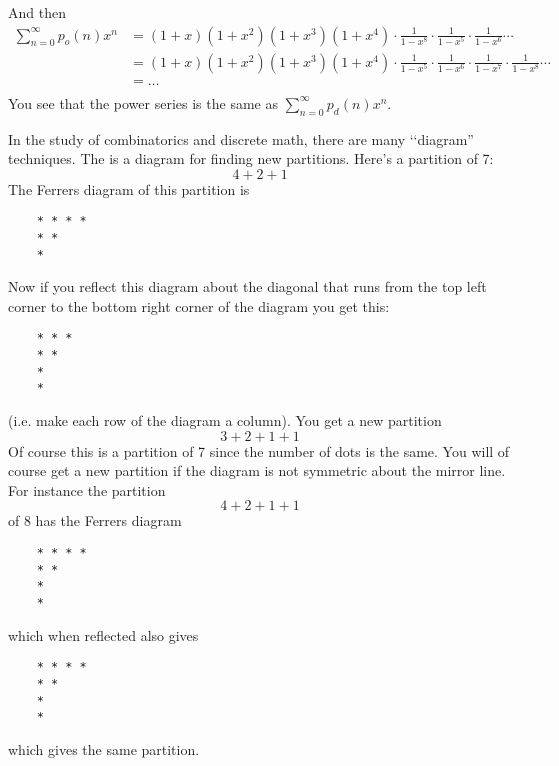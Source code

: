 And then
\begin{align*}
\sum_{n=0}^\infty p_o(n) x^n 
&= (1+x)(1+x^2)(1+x^3)(1+x^4) \cdot \frac{1}{1 - x^8} \cdot \frac{1}{1 - x^5} \cdot \frac{1}{1 - x^6} \cdots \\
&= (1+x)(1+x^2)(1+x^3)(1+x^4) \cdot \frac{1}{1 - x^5} \cdot 
\frac{1}{1 - x^6} \cdot \frac{1}{1 - x^7} \cdot \frac{1}{1 - x^8} \cdots \\
&= \ldots \\
\end{align*}
You see that the power series is the same as $\sum_{n=0}^\infty p_d(n) x^n$.

In the study of combinatorics and discrete math, 
there are many \lq\lq diagram'' techniques.
The  is a diagram for finding new partitions.
Here's a partition of 7:
\[
4 + 2 + 1
\]
The Ferrers diagram of this partition is
\begin{verbatim}
    * * * *
    * * 
    *
\end{verbatim}
Now if you reflect this diagram about the diagonal
that runs from the top left corner
to the bottom right corner of the diagram 
you get this:
\begin{verbatim}
    * * * 
    * * 
    *
    *
\end{verbatim}
(i.e. make each row of the diagram a column).
You get a new partition
\[
3 + 2 + 1 + 1
\]
Of course this is a partition of 7 since the number of dots
is the same.
You will of course get a new partition if the diagram 
is not symmetric about the mirror line.
For instance the partition
\[
4 + 2 + 1 + 1
\]
of 8 has the Ferrers diagram
\begin{verbatim}
    * * * *
    * *
    *
    *
\end{verbatim}
which when reflected also gives
\begin{verbatim}
    * * * *
    * *
    *
    *
\end{verbatim}
which gives the same partition.







%
%


%
%
%





